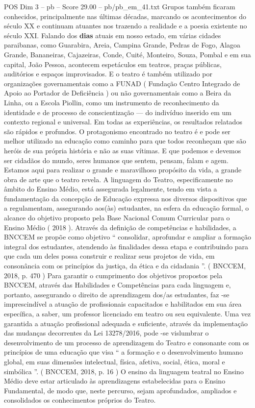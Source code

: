 \begin{textsample}{POS Dim 3 – pb – Score 29.00 – pb/pb\_em\_41.txt}
Grupos também ficaram conhecidos, principalmente nas últimas décadas, marcando os acontecimentos do século XX e continuam atuantes nos trazendo a realidade e a poesia existente no século XXI.
Falando dos \textbf{dias} atuais em nosso estado, em várias cidades paraibanas, como Guarabira, Areia, Campina Grande, Pedras de Fogo, Alagoa Grande, Bananeiras, Cajazeiras, Conde, Cuité, Monteiro, Souza, Pombal e em sua capital, João Pessoa, acontecem espetáculos em teatros, praças públicas, auditórios e espaços improvisados.
E o teatro é também utilizado por organizações governamentais como a FUNAD ( Fundação Centro Integrado de Apoio ao Portador de Deficiência ) ou não governamentais como a Beira da Linha, ou a Escola Piollin, como um instrumento de reconhecimento da identidade e de processo de conscientização — do indivíduo inserido em um contexto regional e universal.
Em todas as experiências, os resultados relatados são rápidos e profundos.
O protagonismo encontrado no teatro é e pode ser melhor utilizado na educação como caminho para que todos reconheçam que são heróis de sua própria história e não as suas vítimas.
E que podemos e devemos ser cidadãos do mundo, seres humanos que sentem, pensam, falam e agem.
Estamos aqui para realizar o grande e maravilhoso propósito da vida, a grande obra de arte que o teatro revela.
A linguagem do Teatro, especificamente no âmbito do Ensino Médio, está assegurada legalmente, tendo em vista a fundamentação da concepção de Educação expressa nos diversos dispositivos que a regulamentam, assegurando aos(às) estudantes, na esfera da educação formal, o alcance do objetivo proposto pela Base Nacional Comum Curricular para o Ensino Médio ( 2018 ).
Através da definição de competências e habilidades, a BNCCEM se propõe como objetivo “ consolidar, aprofundar e ampliar a formação integral dos estudantes, atendendo às finalidades dessa etapa e contribuindo para que cada um deles possa construir e realizar seus projetos de vida, em consonância com os princípios da justiça, da ética e da cidadania ”. ( BNCCEM, 2018, p. 470 ) Para garantir o cumprimento dos objetivos propostos pela BNCCEM, através das Habilidades e Competências para cada linguagem e, portanto, assegurando o direito de aprendizagem dos/as estudantes, faz -se imprescindível a atuação de profissionais capacitados e habilitados em sua área específica, a saber, um professor licenciado em teatro ou seu equivalente.
Uma vez garantida a atuação profissional adequada e suficiente, através da implementação das mudanças decorrentes da Lei 13278/2016, pode -se vislumbrar o desenvolvimento de um processo de aprendizagem do Teatro e consonante com os princípios de uma educação que visa “ a formação e o desenvolvimento humano global, em suas dimensões intelectual, física, afetiva, social, ética, moral e simbólica ”. ( BNCCEM, 2018, p. 16 ) O ensino da linguagem teatral no Ensino Médio deve estar articulado às aprendizagens estabelecidas para o Ensino Fundamental, de modo que, neste percurso, sejam aprofundados, ampliados e consolidados os conhecimentos próprios do Teatro.

\end{textsample}
